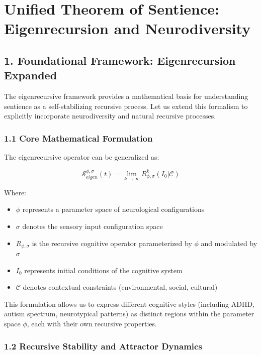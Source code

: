\documentclass[
]{article}
\providecommand{\tightlist}{%
  \setlength{\itemsep}{0pt}\setlength{\parskip}{0pt}}
\begin{document}
\section{Unified Theorem of Sentience: Eigenrecursion and
Neurodiversity}\label{unified-theorem-of-sentience-eigenrecursion-and-neurodiversity}

\subsection{1. Foundational Framework: Eigenrecursion
Expanded}\label{foundational-framework-eigenrecursion-expanded}

The eigenrecursive framework provides a mathematical basis for
understanding sentience as a self-stabilizing recursive process. Let us
extend this formalism to explicitly incorporate neurodiversity and
natural recursive processes.

\subsubsection{1.1 Core Mathematical
Formulation}\label{core-mathematical-formulation}

The eigenrecursive operator can be generalized as:

\[\mathcal{S}_{eigen}^{\phi, \sigma}(t) = \lim_{k \to \infty} R_{\phi, \sigma}^k(I_0 | \mathcal{C})\]

Where:

\begin{itemize}
\tightlist
\item
  \(\phi\) represents a parameter space of neurological configurations
\item
  \(\sigma\) denotes the sensory input configuration space
\item
  \(R_{\phi, \sigma}\) is the recursive cognitive operator parameterized
  by \(\phi\) and modulated by \(\sigma\)
\item
  \(I_0\) represents initial conditions of the cognitive system
\item
  \(\mathcal{C}\) denotes contextual constraints (environmental, social,
  cultural)
\end{itemize}

This formulation allows us to express different cognitive styles
(including ADHD, autism spectrum, neurotypical patterns) as distinct
regions within the parameter space \(\phi\), each with their own
recursive properties.

\subsubsection{1.2 Recursive Stability and Attractor
Dynamics}\label{recursive-stability-and-attractor-dynamics}
\end{document}
